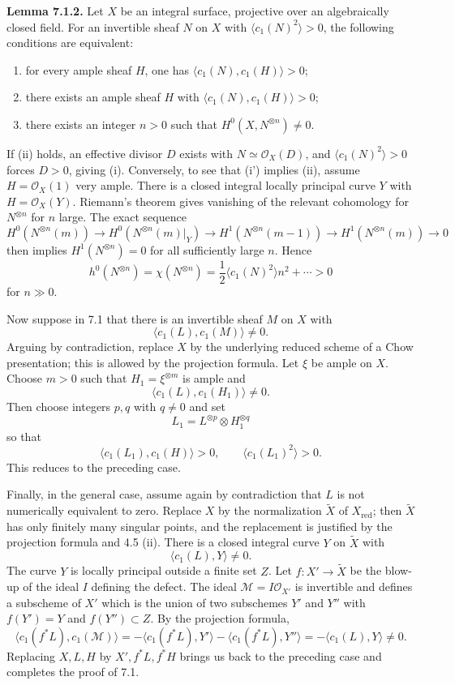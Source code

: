 \documentclass[11pt]{article}
\begin{document}
\textbf{Lemma 7.1.2.} Let $X$ be an integral surface, projective over an algebraically closed field. For an invertible sheaf $N$ on $X$ with $\langle c_1(N)^2\rangle>0$, the following conditions are equivalent:
\begin{enumerate}[label=\roman*)]
\item for every ample sheaf $H$, one has $\langle c_1(N),c_1(H)\rangle>0$;
\item[(i')] there exists an ample sheaf $H$ with $\langle c_1(N),c_1(H)\rangle>0$;
\item there exists an integer $n>0$ such that $H^0(X,N^{\otimes n})\ne0$.
\end{enumerate}
If (ii) holds, an effective divisor $D$ exists with $N\simeq\mathcal O_X(D)$, and $\langle c_1(N)^2\rangle>0$ forces $D>0$, giving (i). Conversely, to see that (i') implies (ii), assume $H=\mathcal O_X(1)$ very ample. There is a closed integral locally principal curve $Y$ with $H=\mathcal O_X(Y)$. Riemann's theorem gives vanishing of the relevant cohomology for $N^{\otimes n}$ for $n$ large. The exact sequence
\[
 H^0(N^{\otimes n}(m))\to H^0(N^{\otimes n}(m)|_Y)\to
 H^1(N^{\otimes n}(m-1))\to H^1(N^{\otimes n}(m))\to0
\]
then implies $H^1(N^{\otimes n})=0$ for all sufficiently large $n$. Hence
\[
   h^0(N^{\otimes n})=\chi(N^{\otimes n})=\frac12\langle c_1(N)^2\rangle n^2+\cdots>0
\]
for $n\gg0$.

Now suppose in 7.1 that there is an invertible sheaf $M$ on $X$ with
\[
   \langle c_1(L),c_1(M)\rangle\ne0.
\]
Arguing by contradiction, replace $X$ by the underlying reduced scheme of a Chow presentation; this is allowed by the projection formula. Let $\xi$ be ample on $X$. Choose $m>0$ such that $H_1=\xi^{\otimes m}$ is ample and
\[
   \langle c_1(L),c_1(H_1)\rangle\ne0.
\]
Then choose integers $p,q$ with $q\ne0$ and set
\[
   L_1=L^{\otimes p}\otimes H_1^{\otimes q}
\]
so that
\[
   \langle c_1(L_1),c_1(H)\rangle>0,
   \qquad
   \langle c_1(L_1)^2\rangle>0.
\]
This reduces to the preceding case.

Finally, in the general case, assume again by contradiction that $L$ is not numerically equivalent to zero. Replace $X$ by the normalization $\widetilde X$ of $X_{\mathrm{red}}$; then $\widetilde X$ has only finitely many singular points, and the replacement is justified by the projection formula and 4.5 (ii). There is a closed integral curve $Y$ on $\widetilde X$ with
\[
   \langle c_1(L),Y\rangle\ne0.
\]
The curve $Y$ is locally principal outside a finite set $Z$. Let $f:X'\to\widetilde X$ be the blow-up of the ideal $I$ defining the defect. The ideal $\mathcal M=I\mathcal O_{X'}$ is invertible and defines a subscheme of $X'$ which is the union of two subschemes $Y'$ and $Y''$ with $f(Y')=Y$ and $f(Y'')\subset Z$. By the projection formula,
\[
 \langle c_1(f^*L),c_1(\mathcal M)\rangle
 =-\langle c_1(f^*L),Y'\rangle-\langle c_1(f^*L),Y''\rangle
 =-\langle c_1(L),Y\rangle\ne0.
\]
Replacing $X,L,H$ by $X',f^*L,f^*H$ brings us back to the preceding case and completes the proof of 7.1.
\end{document}
